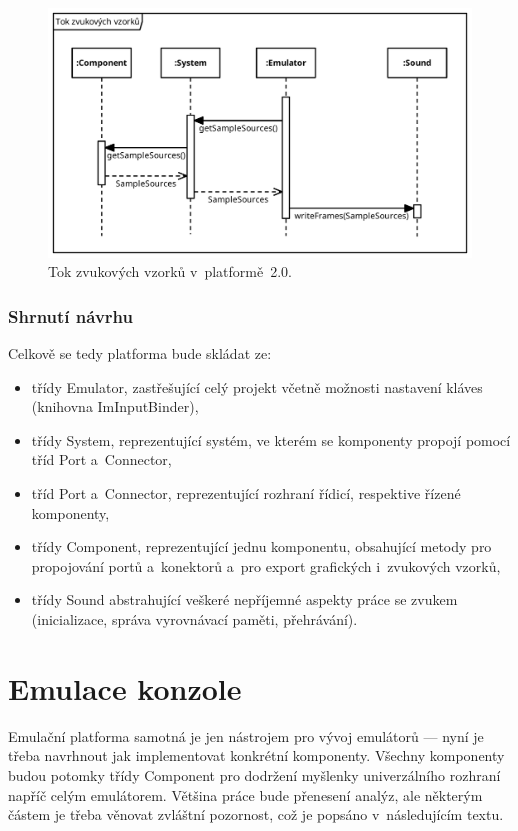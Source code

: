 \begin{figure}[ht!]
	\centering
	\includegraphics[width=1.0\textwidth]{images/tok_vzorku.pdf}
	\caption{Tok zvukových vzorků v~platformě~2.0.}\label{fig:navrh-audio-tok}
\end{figure}

\subsubsection{Shrnutí návrhu}
Celkově se tedy platforma bude skládat ze:
\begin{itemize}
	\item třídy Emulator, zastřešující celý projekt včetně možnosti nastavení kláves (knihovna ImInputBinder),
	\item třídy System, reprezentující systém, ve kterém se komponenty propojí pomocí tříd Port a~Connector,
	\item tříd Port a~Connector, reprezentující rozhraní řídicí, respektive řízené komponenty,
	\item třídy Component, reprezentující jednu komponentu, obsahující metody pro propojování portů a~konektorů a~pro export grafických i~zvukových vzorků,
	\item třídy Sound abstrahující veškeré nepříjemné aspekty práce se zvukem (inicializace, správa vyrovnávací paměti, přehrávání).
\end{itemize}

\section{Emulace konzole}
Emulační platforma samotná je jen nástrojem pro vývoj emulátorů --- nyní je třeba navrhnout jak implementovat konkrétní komponenty. Všechny komponenty budou potomky třídy Component pro dodržení myšlenky univerzálního rozhraní napříč celým emulátorem. Většina práce bude přenesení analýz, ale některým částem je třeba věnovat zvláštní pozornost, což je popsáno v~následujícím textu.


